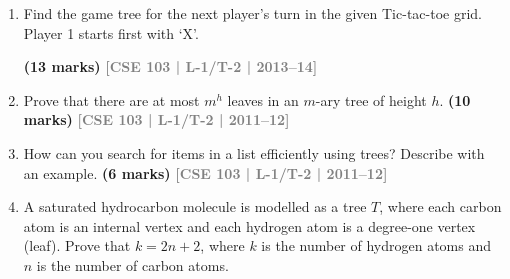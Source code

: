 \documentclass[12pt,a3paper]{article}
\newcommand{\yr}[1]{\hfill\textcolor{gray}{\small\textbf{[#1]}}}
\newcommand{\mk}[1]{\textcolor{orange!70!black}{\small\textbf{(#1 marks)}}}
\begin{document}
\begin{enumerate}
\mk{13} \yr{CSE 103 | L-1/T-2 | 2013--14}

\item Find the game tree for the next player's turn in the given Tic-tac-toe grid. Player 1 starts first with `X'.
\begin{center}
\end{center}

\mk{13} \yr{CSE 103 | L-1/T-2 | 2013--14}  

\item Prove that there are at most $m^h$ leaves in an $m$-ary tree of height $h$.
\mk{10} \yr{CSE 103 | L-1/T-2 | 2011--12}

\item How can you search for items in a list efficiently using trees? Describe with an example.
\mk{6} \yr{CSE 103 | L-1/T-2 | 2011--12}

\item A saturated hydrocarbon molecule is modelled as a tree $T$, where each carbon atom is an internal vertex and each hydrogen atom is a degree-one vertex (leaf). Prove that $k = 2n + 2$, where $k$ is the number of hydrogen atoms and $n$ is the number of carbon atoms.
\begin{center}
    

\end{center}
\end{enumerate}
\end{document}
